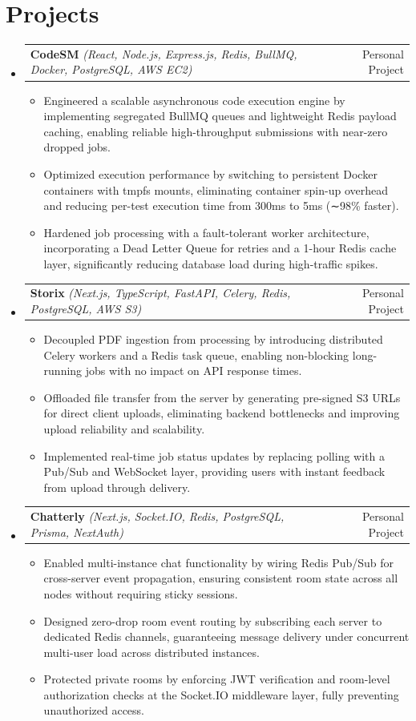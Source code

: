 \documentclass[letterpaper,10pt]{article}
\makeatletter
\newenvironment{resumeList}{
  \begin{itemize}[leftmargin=0.15in, label={}]
}{
  \end{itemize}
}
\newcommand{\resumeItem}[1]{
  \item\small{
    {#1 \vspace{-2.5pt}}
  }
}
\newcommand{\resumeProjectHeading}[3]{
  \vspace{-2pt}\item
    \begin{tabular*}{0.97\textwidth}[t]{l@{\extracolsep{\fill}}r}
      \textbf{#1} \textit{\small(#2)} & #3 \\
    \end{tabular*}\vspace{-6pt}
}
\newcommand{\resumeItemListStart}{\begin{itemize}[leftmargin=0.15in]}
\newcommand{\resumeItemListEnd}{\end{itemize}\vspace{-5pt}}
\makeatother
\begin{document}
\section{Projects}
\begin{resumeList}
    \resumeProjectHeading
    {CodeSM}{React, Node.js, Express.js, Redis, BullMQ, Docker, PostgreSQL, AWS EC2}{Personal Project}
  \resumeItemListStart
    \resumeItem{Engineered a scalable asynchronous code execution engine by implementing segregated BullMQ queues and lightweight Redis payload caching, enabling reliable high-throughput submissions with near-zero dropped jobs.}
    \resumeItem{Optimized execution performance by switching to persistent Docker containers with tmpfs mounts, eliminating container spin-up overhead and reducing per-test execution time from 300ms to 5ms (∼98\% faster).}
    \resumeItem{Hardened job processing with a fault-tolerant worker architecture, incorporating a Dead Letter Queue for retries and a 1-hour Redis cache layer, significantly reducing database load during high-traffic spikes.}
  \resumeItemListEnd

  \resumeProjectHeading
    {Storix}{Next.js, TypeScript, FastAPI, Celery, Redis, PostgreSQL, AWS S3}{Personal Project}
  \resumeItemListStart
    \resumeItem{Decoupled PDF ingestion from processing by introducing distributed Celery workers and a Redis task queue, enabling non-blocking long-running jobs with no impact on API response times.}
    \resumeItem{Offloaded file transfer from the server by generating pre-signed S3 URLs for direct client uploads, eliminating backend bottlenecks and improving upload reliability and scalability.}
    \resumeItem{Implemented real-time job status updates by replacing polling with a Pub/Sub and WebSocket layer, providing users with instant feedback from upload through delivery.}
  \resumeItemListEnd

  \resumeProjectHeading
    {Chatterly}{Next.js, Socket.IO, Redis, PostgreSQL, Prisma, NextAuth}{Personal Project}
  \resumeItemListStart
    \resumeItem{Enabled multi-instance chat functionality by wiring Redis Pub/Sub for cross-server event propagation, ensuring consistent room state across all nodes without requiring sticky sessions.}
    \resumeItem{Designed zero-drop room event routing by subscribing each server to dedicated Redis channels, guaranteeing message delivery under concurrent multi-user load across distributed instances.}
    \resumeItem{Protected private rooms by enforcing JWT verification and room-level authorization checks at the Socket.IO middleware layer, fully preventing unauthorized access.}
  \resumeItemListEnd
\end{resumeList}
\end{document}
